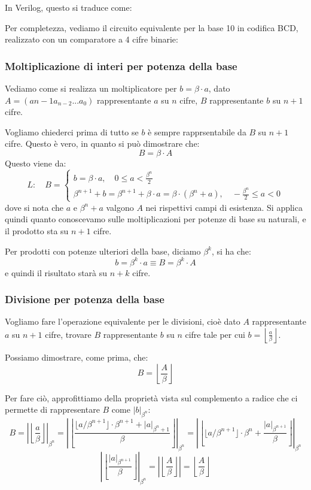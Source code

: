 \documentclass[a4paper,11pt]{article}
\begin{document}
In Verilog, questo si traduce come:



Per completezza, vediamo il circuito equivalente per la base 10 in codifica BCD, realizzato con un comparatore a 4 cifre binarie:



\subsubsection{Moltiplicazione di interi per potenza della base}
Vediamo come si realizza un moltiplicatore per $b = \beta \cdot a$, dato $A = \left(a{n-1} a_{n-2} ... a_0 \right)$ rappresentante $a$ su $n$ cifre, $B$ rappresentante $b$ su $n+1$ cifre.

Vogliamo chiederci prima di tutto se $b$ è sempre rapprsentabile da $B$ su $n+1$ cifre. Questo è vero, in quanto si può dimostrare che:
$$
B = \beta \cdot A
$$
Questo viene da:
$$
L: \quad B =
\begin{cases}
	b = \beta \cdot a, \quad 0 \leq a < \frac{\beta^n}{2} \\ 
	\beta^{n+1} + b = \beta^{n+1} + \beta \cdot a = \beta \cdot \left( \beta^n + a \right), \quad -\frac{\beta^n}{2} \leq a < 0
\end{cases}
$$
dove si nota che $a$ e $\beta^n + a$ valgono $A$ nei rispettivi campi di esistenza.
Si applica quindi quanto conoscevamo sulle moltiplicazioni per potenze di base su naturali, e il prodotto sta su $n+1$ cifre.

Per prodotti con potenze ulteriori della base, diciamo $\beta^k$, si ha che:
$$
b = \beta^k \cdot a \equiv B = \beta^k \cdot A
$$
e quindi il risultato starà su $n + k$ cifre.

\subsubsection{Divisione per potenza della base}
Vogliamo fare l'operazione equivalente per le divisioni, cioè dato $A$ rappresentante $a$ su $n+1$ cifre, trovare $B$ rappresentante $b$ su $n$ cifre tale per cui $b = \left\lfloor \frac{a}{\beta} \right\rfloor$.

Possiamo dimostrare, come prima, che:
$$
B = \left\lfloor \frac{A}{\beta} \right\rfloor
$$

Per fare ciò, approfittiamo della proprietà vista sul complemento a radice che ci permette di rappresentare $B$ come $|b|_{\beta^n}$:
$$
B = \left| \left\lfloor \frac{a}{\beta} \right\rfloor \right|_{\beta^n} = \left| \left\lfloor \frac{ \lfloor a/\beta^{n+1} \rfloor \cdot \beta^{n+1} + |a|_{\beta^n+1} }{\beta} \right\rfloor \right|_{\beta^n} = \left| \left\lfloor \lfloor a / \beta^{n+1} \rfloor \cdot \beta^n + \frac{|a|_{\beta^{n+1}}}{\beta} \right\rfloor  \right|_{\beta^n}
$$
$$
\left| \left\lfloor \frac{|a|_{\beta^{n+1}}}{\beta} \right\rfloor  \right|_{\beta^n}
= \left| \left\lfloor \frac{A}{\beta} \right\rfloor \right| = \left\lfloor \frac{A}{\beta} \right\rfloor
$$
\end{document}
